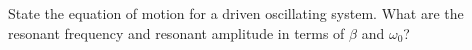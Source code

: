 

\vspace*{\fill}
\centering

State the equation of motion for a driven oscillating system. What are the resonant frequency and resonant amplitude in terms of $\beta$ and $\omega_0$?

\centering
\vspace*{\fill}

